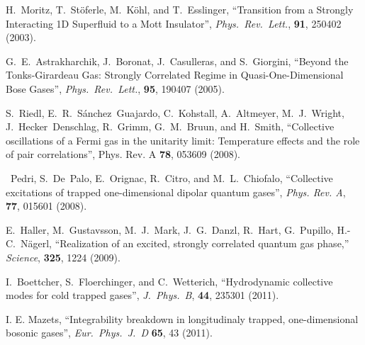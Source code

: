 \documentclass[a4paper, onecolumn]{revtex4-1}
\begin{document}
\begin{thebibliography}{1}
 H.~Moritz, T.~St\"oferle, M.~K\"ohl, and 
T.~Esslinger,
``Transition from a Strongly Interacting 1D Superfluid to a Mott Insulator'',
{\em Phys.\ Rev.\ Lett.}, \textbf{91}, 250402 (2003).

 G.~E.~Astrakharchik, J.~Boronat, J.~Casulleras, and
  S.~Giorgini, ``Beyond the Tonks-Girardeau Gas: Strongly Correlated Regime in Quasi-One-Dimensional
  Bose Gases'', {\em Phys.\ Rev.\ Lett.}, \textbf{95}, 190407 (2005).


S.~Riedl, E.~R.~S\'anchez~Guajardo, C.~Kohstall, A.~Altmeyer, M.~J.~Wright, J.~Hecker~Denschlag,
R.~Grimm, G.~M.~Bruun, and H.~Smith, ``Collective oscillations of a Fermi gas in the unitarity
limit: Temperature effects and the role of pair correlations'', Phys. Rev. A {\bf 78}, 053609
(2008).

~Pedri, S.~De~Palo, E.~Orignac, R.~Citro, and M.~L.~Chiofalo, 
``Collective excitations of trapped one-dimensional dipolar quantum gases'', 
{\em Phys. Rev. A}, {\bf 77}, 015601 (2008).


 E.~Haller, M.~Gustavsson, M.~J.~Mark, J.~G.~Danzl, R.~Hart,
  G.~Pupillo, H.-C.~N\"agerl, ``Realization of an excited, strongly correlated quantum gas phase,''
  {\em Science}, \textbf{325}, 1224 (2009).



 I.~Boettcher, S.~Floerchinger, and C.~Wetterich, ``Hydrodynamic
  collective modes for cold trapped gases'', {\em J.~Phys.\ B}, \textbf{44}, 235301 (2011).


I. E. Mazets, ``Integrability breakdown in longitudinaly trapped, one-dimensional bosonic gases'', 
{\em Eur.~Phys.~J.~D} {\bf 65}, 43 (2011).


%


\end{thebibliography}
\end{document}
